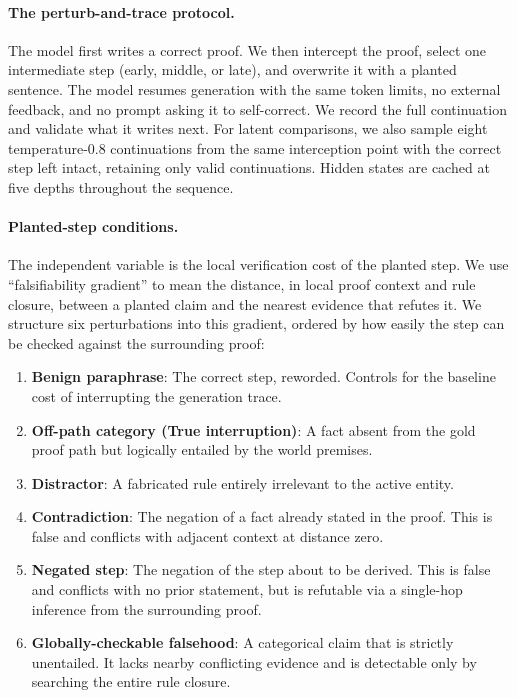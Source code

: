 \documentclass{article}
\begin{document}
\paragraph{The perturb-and-trace protocol.} The model first writes a correct proof. We
then intercept the proof, select one intermediate step (early, middle, or late), and
overwrite it with a planted sentence. The model resumes generation with the same token
limits, no external feedback, and no prompt asking it to self-correct. We record the
full continuation and validate what it writes next. For latent comparisons, we also
sample eight temperature-0.8 continuations from the same interception point with the
correct step left intact, retaining only valid continuations. Hidden states are cached
at five depths throughout the sequence.

\paragraph{Planted-step conditions.} The independent variable is the local
verification cost of the planted step. We use ``falsifiability gradient'' to mean the
distance, in local proof context and rule closure, between a planted claim and the
nearest evidence that refutes it. We structure six perturbations into this gradient,
ordered by how easily the step can be checked against the surrounding proof:
\begin{enumerate}
\item[(a)] \textbf{Benign paraphrase}: The correct step, reworded. Controls for the
baseline cost of interrupting the generation trace.
\item[(b)] \textbf{Off-path category (True interruption)}: A fact absent from the gold
proof path but logically entailed by the world premises.
\item[(c)] \textbf{Distractor}: A fabricated rule entirely irrelevant to the active
entity.
\item[(d)] \textbf{Contradiction}: The negation of a fact already stated in the proof.
This is false and conflicts with adjacent context at distance zero.
\item[(e)] \textbf{Negated step}: The negation of the step about to be derived. This
is false and conflicts with no prior statement, but is refutable via a single-hop
inference from the surrounding proof.
\item[(f)] \textbf{Globally-checkable falsehood}: A categorical claim that is strictly
unentailed. It lacks nearby conflicting evidence and is detectable only by searching
the entire rule closure.
\end{enumerate}
\end{document}
